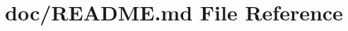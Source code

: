 \hypertarget{_r_e_a_d_m_e_8md}{}\section{doc/\+R\+E\+A\+D\+ME.md File Reference}
\label{_r_e_a_d_m_e_8md}
